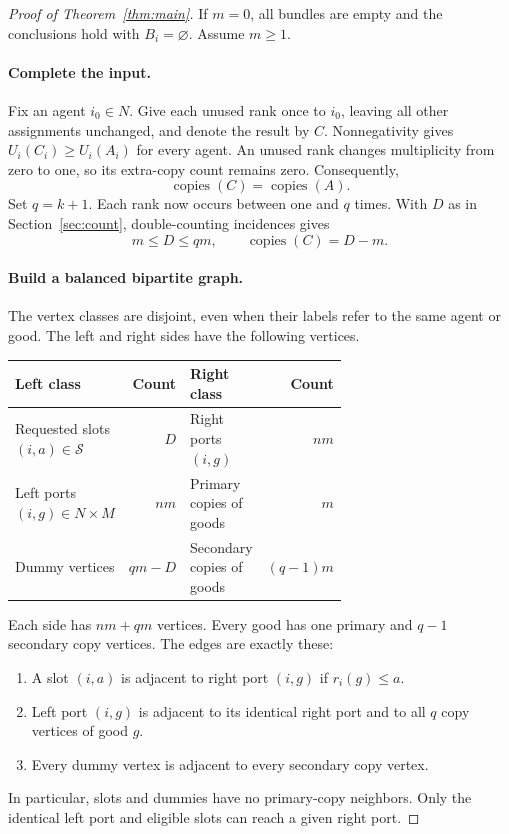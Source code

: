 \documentclass[11pt,a4paper]{article}
\newcommand{\copies}{\operatorname{copies}}
\begin{document}
\begin{proof}[Proof of Theorem~\ref{thm:main}]
If $m=0$, all bundles are empty and the conclusions hold with $B_i=\varnothing$.
Assume $m\ge1$.

\paragraph{Complete the input.}
Fix an agent $i_0\in N$. Give each unused rank once to $i_0$, leaving all
other assignments unchanged, and denote the result by $C$.
Nonnegativity gives $U_i(C_i)\ge U_i(A_i)$ for every agent. An unused rank
changes multiplicity from zero to one, so its extra-copy count remains zero.
Consequently,
\[
 \copies(C)=\copies(A).
\]
Set $q=k+1$. Each rank now occurs between one and $q$ times. With $D$ as in
Section~\ref{sec:count}, double-counting incidences gives
\begin{equation}\label{eq:D}
 m\le D\le qm,\qquad \copies(C)=D-m.
\end{equation}

\paragraph{Build a balanced bipartite graph.}
The vertex classes are disjoint, even when their labels refer to the same
agent or good. The left and right sides have the following vertices.
\begin{center}
\begin{tabular}{@{}p{0.36\linewidth}rp{0.30\linewidth}r@{}}
\toprule
Left class & Count & Right class & Count\\
\midrule
Requested slots $(i,a)\in\mathcal S$ & $D$ & Right ports $(i,g)$ & $nm$\\
Left ports $(i,g)\in N\times M$ & $nm$ & Primary copies of goods & $m$\\
Dummy vertices & $qm-D$ & Secondary copies of goods & $(q-1)m$\\
\bottomrule
\end{tabular}
\end{center}
Each side has $nm+qm$ vertices. Every good has one primary and $q-1$
secondary copy vertices. The edges are exactly these:
\begin{enumerate}[nosep]
\item A slot $(i,a)$ is adjacent to right port $(i,g)$ if $r_i(g)\le a$.
\item Left port $(i,g)$ is adjacent to its identical right port and to all
$q$ copy vertices of good $g$.
\item Every dummy vertex is adjacent to every secondary copy vertex.
\end{enumerate}
In particular, slots and dummies have no primary-copy neighbors. Only the
identical left port and eligible slots can reach a given right port.


\end{proof}
\end{document}

